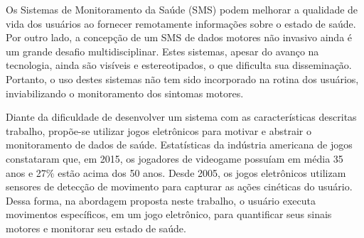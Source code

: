 


Os Sistemas de Monitoramento da Saúde (SMS) podem melhorar a qualidade de vida dos usuários ao fornecer remotamente informações sobre o estado de saúde. Por outro lado, a concepção de um SMS de dados motores não invasivo ainda é um grande desafio multidisciplinar. Estes sistemas, apesar do avanço na tecnologia, ainda são visíveis e estereotipados, o que dificulta sua disseminação. Portanto, o uso destes sistemas não tem sido incorporado na rotina dos usuários, inviabilizando o monitoramento dos sintomas motores. 

Diante da dificuldade de desenvolver um sistema com as características descritas trabalho, propõe-se utilizar jogos eletrônicos para motivar e abstrair o monitoramento de dados de saúde. Estatísticas da indústria americana de jogos constataram que, em 2015, os jogadores de videogame possuíam em média 35 anos e 27$\%$  estão acima dos 50 anos. Desde 2005, os jogos eletrônicos utilizam sensores de detecção de movimento para capturar as ações cinéticas do usuário. Dessa forma, na abordagem proposta neste trabalho, o usuário executa movimentos específicos, em um jogo eletrônico, para quantificar seus sinais motores e monitorar seu estado de saúde.

